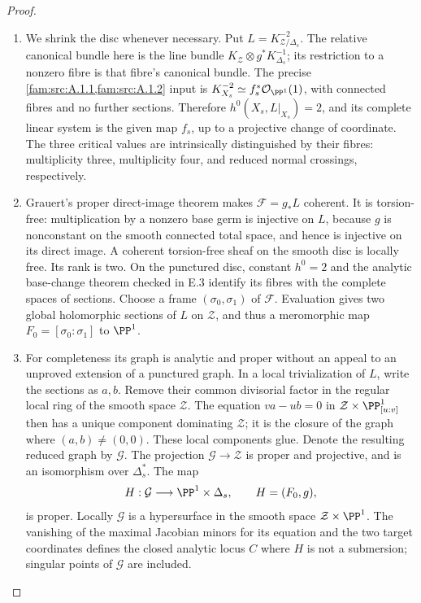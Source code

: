 \begin{proof}
\begin{enumerate}[label=\arabic*.,leftmargin=*]
\item We shrink the disc whenever necessary. Put
$L=K_{\mathcal Z/\Delta_s}^{-2}$. The relative canonical
bundle here is the line bundle
$K_{\mathcal Z}\otimes g^*K_{\Delta_s}^{-1}$; its
restriction to a nonzero fibre is that fibre's canonical bundle.
The precise \cref{fam:src:A.1.1,fam:src:A.1.2} input is
$K_{X_s}^{-2}\simeq f_s^*\mathcal O_{\PP^1}(1)$,
with connected fibres and no further sections. Therefore
$h^0(X_s,L|_{X_s})=2$, and its complete linear system is
the given map $f_s$, up to a projective change of coordinate.
The three critical values are intrinsically distinguished by
their fibres: multiplicity three, multiplicity four, and reduced
normal crossings, respectively.

\item Grauert's proper direct-image theorem
\citep[Section 6, Hauptsatz I]{Grauert1960D} makes
$\mathcal F=g_*L$ coherent. It is torsion-free: multiplication
by a nonzero base germ is injective on $L$, because $g$ is
nonconstant on the smooth connected total space, and hence is injective on
its direct image. A coherent torsion-free sheaf on the smooth
disc is locally free. Its rank is two. On the punctured disc,
constant $h^0=2$ and the analytic base-change theorem checked
in E.3 identify its fibres with the complete spaces of sections.
Choose a frame $(\sigma_0,\sigma_1)$ of $\mathcal F$.
Evaluation gives two global holomorphic sections of $L$ on
$\mathcal Z$, and thus a meromorphic map
$F_0=[\sigma_0:\sigma_1]$ to $\PP^1$.

\item For completeness its graph is analytic and proper without an
appeal to an unproved extension of a punctured graph. In a local
trivialization of $L$, write the sections as $a,b$. Remove their
common divisorial factor in the regular local ring of the smooth
space $\mathcal Z$. The equation
$v a-u b=0$ in $\mathcal Z\times\PP^1_{[u:v]}$
then has a unique component dominating $\mathcal Z$; it is
the closure of the graph where $(a,b)\ne(0,0)$. These local
components glue. Denote the resulting reduced graph by
$\mathcal G$. The projection $\mathcal G\to\mathcal Z$
is proper and projective, and is an isomorphism over
$\Delta_s^*$. The map
\[
 H:\mathcal G\longrightarrow\PP^1\times\Delta_s,
 \qquad H=(F_0,g),
\]
is proper. Locally $\mathcal G$ is a hypersurface in the smooth
space $\mathcal Z\times\PP^1$. The vanishing of the maximal
Jacobian minors for its equation and the two target coordinates
defines the closed analytic locus $C$ where $H$ is not a
submersion; singular points of $\mathcal G$ are included.


\end{enumerate}
\end{proof}
